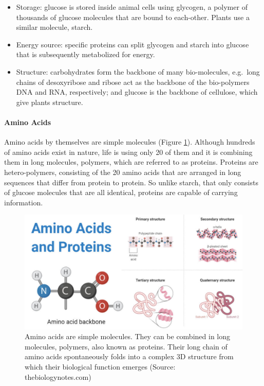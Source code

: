 \documentclass[
  11pt,
]{book}
\providecommand{\tightlist}{%
  \setlength{\itemsep}{0pt}\setlength{\parskip}{0pt}}
\begin{document}
\begin{itemize}
\tightlist
\item
  Storage: glucose is stored inside animal cells using glycogen, a polymer of thousands of glucose molecules that are bound to each-other. Plants use a similar molecule, starch.
\item
  Energy source: specific proteins can split glycogen and starch into glucose that is subsequently metabolized for energy.
\item
  Structure: carbohydrates form the backbone of many bio-molecules, e.g.~long chains of desoxyribose and ribose act as the backbone of the bio-polymers DNA and RNA, respectively; and glucose is the backbone of cellulose, which give plants structure.
\end{itemize}

\pagebreak

\hypertarget{sectionAminoAcids}{%
\paragraph{Amino Acids}\label{sectionAminoAcids}}

Amino acids by themselves are simple molecules (Figure \ref{fig:aminoAcids}).
Although hundreds of amino acids exist in nature, life is using only 20 of them and it is combining them in long molecules, polymers, which are referred to as proteins.
Proteins are hetero-polymers, consisting of the 20 amino acids that are arranged in long sequences that differ from protein to protein.
So unlike starch, that only consists of glucose molecules that are all identical, proteins are capable of carrying information.



\begin{figure}

{\centering \includegraphics[width=1\linewidth]{./figs/Amino-acids-and-Proteins} 

}

\caption{Amino acids are simple molecules. They can be combined in long molecules, polymers, also known as proteins. Their long chain of amino acids spontaneously folds into a complex 3D structure from which their biological function emerges (Source: thebiologynotes.com)}\label{fig:aminoAcids}
\end{figure}
\end{document}
